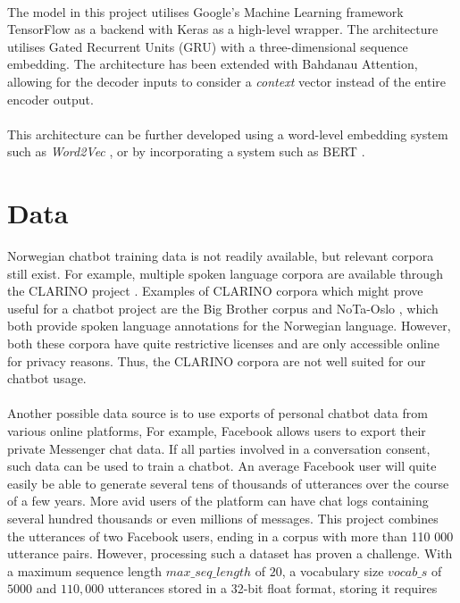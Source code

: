 \documentclass{article}
\begin{document}
\paragraph{}
The model in this project utilises Google's Machine Learning framework
TensorFlow as a backend with Keras as a high-level wrapper. The architecture
utilises Gated Recurrent Units (GRU) with a three-dimensional sequence
embedding. The architecture has been extended with Bahdanau Attention, allowing
for the decoder inputs to consider a \textit{context} vector instead of the
entire encoder output.

\paragraph{}
This architecture can be further developed using a word-level embedding system
such as \textit{Word2Vec} \cite{word2vec}, or by incorporating a system such
as BERT \cite{bert2018}.

\section*{Data}
Norwegian chatbot training data is not readily available, but relevant corpora
still exist.  For example, multiple spoken language corpora are available
through the CLARINO project \cite{clarino-about}. Examples of CLARINO
corpora which might prove useful for a chatbot project are the Big Brother
corpus \cite{clarino-bb} and NoTa-Oslo \cite{clarino-nota}, which both provide
spoken language annotations for the Norwegian language. However, both these
corpora have quite restrictive licenses and are only accessible online for
privacy reasons. Thus, the CLARINO corpora are not well suited for our chatbot
usage.

\paragraph{}
Another possible data source is to use exports of personal chatbot data from
various online platforms, For example, Facebook allows users to export their
private Messenger chat data. If all parties involved in a conversation consent,
such data can be used to train a chatbot. An average Facebook user will quite
easily be able to generate several tens of thousands of utterances over the
course of a few years. More avid users of the platform can have chat logs
containing several hundred thousands or even millions of messages. This project
combines the utterances of two Facebook users, ending in a corpus with more
than 110 000 utterance pairs. However, processing such a dataset has proven a
challenge. With a maximum sequence length $max\_seq\_length$ of $20$, a
vocabulary size $vocab\_s$ of $5000$ and $110,000$ utterances stored in a 32-bit
float format, storing it requires
\end{document}
